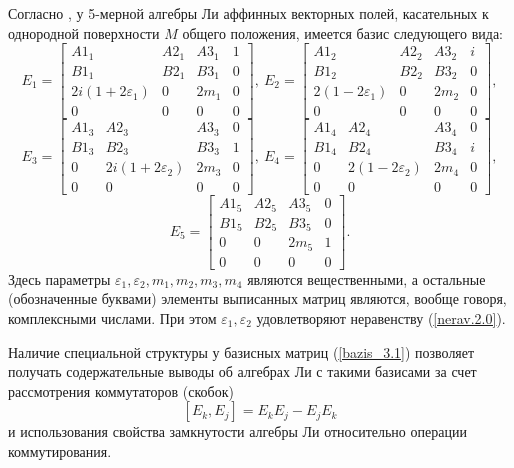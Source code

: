   Согласно \cite{Loboda01}, у 5-мерной алгебры Ли аффинных векторных полей,
касательных к однородной поверхности $ M $ общего положения, имеется базис
следующего вида:
$$
E_1=
\left[ \begin {array}{cccc}
A1_1 & A2_1 & A3_1 & 1 \\
B1_1 & B2_1 & B3_1 & 0 \\
2i(1+2\varepsilon_1) & 0 & 2m_1 & 0 \\
0 & 0 & 0 & 0
\end{array}\right]
,\
E_2=
\left[ \begin {array}{cccc}
A1_2 & A2_2 & A3_2 & i \\
B1_2 & B2_2 & B3_2 & 0 \\
2 (1- 2\varepsilon_1) & 0 & 2 m_2 & 0 \\
0 & 0 & 0 & 0
\end{array}\right],
$$
\begin{equation}\label{bazis_3.1}
E_3=
\left[ \begin {array}{cccc}
A1_3 & A2_3 & A3_3 & 0 \\
B1_3 & B2_3 & B3_3 & 1 \\
0 & 2i(1+2\varepsilon_2) & 2m_3 & 0 \\
0 & 0 & 0 & 0
\end{array}\right]
,\
E_4=
\left[ \begin {array}{cccc}
A1_4 & A2_4 & A3_4 & 0 \\
B1_4 & B2_4 & B3_4 & i \\
0 & 2(1-2\varepsilon_2) & 2m_4 & 0 \\
0 & 0 & 0 & 0
\end{array}\right],
\end{equation}
$$
E_5=
\left[ \begin {array}{cccc}
A1_5 & A2_5 & A3_5 & 0 \\
B1_5 & B2_5 & B3_5 & 0 \\
0 & 0 & 2m_5 & 1 \\
0 & 0 & 0 & 0
\end{array}\right].
$$
    Здесь параметры $ \varepsilon_1, \varepsilon_2, m_1, m_2, m_3, m_4 $ являются вещественными,
а остальные (обозначенные буквами) элементы выписанных матриц являются,
вообще говоря, комплексными числами. При этом $ \varepsilon_1, \varepsilon_2 $
удовлетворяют неравенству (\ref{nerav.2.0}).

  Наличие специальной структуры у базисных матриц (\ref{bazis_3.1}) позволяет получать
содержательные выводы об алгебрах Ли с такими базисами за счет рассмотрения
коммутаторов (скобок)
$$
    [ E_k, E_j ] = E_k E_j - E_j E_k
$$
и использования свойства замкнутости алгебры Ли относительно
операции коммутирования.

